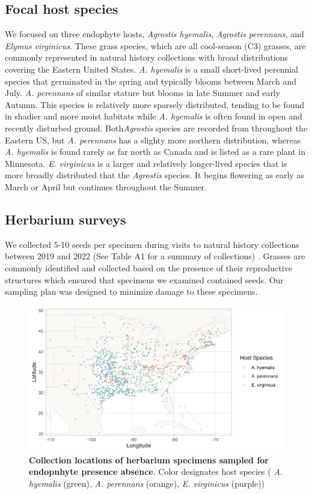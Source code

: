 \documentclass[11pt]{article}
\begin{document}
        \subsection*{Focal host species}
We focused on three endophyte hosts, \emph{Agrostis hyemalis}, \emph{Agrostis perennans}, and \emph{Elymus virginicus}.
These grass species, which are all cool-season (C3) grasses, are commonly represented in natural history collections with broad distributions covering the Eastern United States.
\emph{A. hyemalis} is a small short-lived perennial species that germinated in the spring and typically blooms between March and July.
\emph{A. perennans} of similar stature but blooms in late Summer and early Autumn. 
This species is relatively more  sparsely distributed, tending to be found in shadier and more moist habitats while \emph{A. hyemalis} is often found in open and recently disturbed ground. 
Both\emph{Agrostis} species are recorded from throughout the Eastern US, but \emph{A. perennans} has a slighty more northern distribution, whereas \emph{A. hyemalis} is found rarely as far north as Canada and is listed as a rare plant in Minnesota.
\emph{E. virginicus} is a larger and relatively longer-lived  species that is more broadly distributed that the \emph{Agrostis} species. 
It begins flowering as early as March or April but continues throughout the Summer.

		\subsection*{Herbarium surveys}
We collected 5-10 seeds per specimen during visits to natural history collections between 2019 and 2022 (See Table A1 for a summary of collections) . 
Grasses are commonly identified and collected based on the presence of their reproductive structures which ensured that specimens we examined contained seeds. 
Our sampling plan was designed to minimize damage to these specimens.

\begin{figure}[H]
	\centering
	\includegraphics[width = \linewidth]{collections_map.png}
	\caption{\textbf{Collection locations of herbarium specimens sampled for endopnhyte presence absence}. Color designates host species ( \emph{A. hyemalis} (green), \emph{A. perennans} (orange), \emph{E. virginicus} (purple))}
\end{figure}
\end{document}
